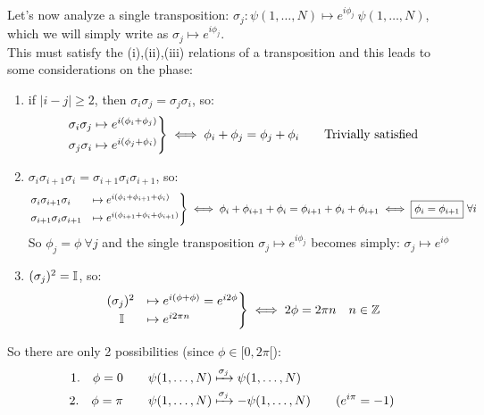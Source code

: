 Let's now analyze a single transposition: $\sigma_j : \psi(1,\dots, N) \mapsto e^{i\phi_j} \ \psi(1,\dots, N)$, which we will simply write as $\sigma_j \mapsto e^{i\phi_j}$.\\
This must satisfy the (i),(ii),(iii) relations of a transposition and this leads to some considerations on the phase:
\begin{enumerate}[label=\roman*]
    \item if $|i-j| \ge 2$, then $\sigma_i\sigma_j = \sigma_j\sigma_i$, so:
    \begin{align*}
    \begin{rcases}
        \sigma_i\sigma_j \mapsto e^{i(\phi_i + \phi_j)} \\
        \sigma_j\sigma_i \mapsto e^{i(\phi_j + \phi_i)}
    \end{rcases}
    \iff \phi_i + \phi_j = \phi_j + \phi_i \qquad \text{Trivially satisfied}
    \end{align*}
    
    \item $\sigma_i\sigma_{i+1} \sigma_i = \sigma_{i+1}\sigma_i\sigma_{i+1}$, so:
    \begin{equation*}
    \begin{rcases}    
        \sigma_i\sigma_{i+1}\sigma_i &\mapsto e^{i(\phi_i + \phi_{i+1} + \phi_i)} \\
        \sigma_{i+1}\sigma_i\sigma_{i+1} &\mapsto e^{i(\phi_{i+1} + \phi_i + \phi_{i+1})}
    \end{rcases}
    \iff \phi_i + \phi_{i+1} + \phi_i = \phi_{i+1} + \phi_i + \phi_{i+1}
    \iff \boxed{\phi_i = \phi_{i+1}} \ \forall i
    \end{equation*}
    So $\phi_j = \phi \ \forall j$ and the single transposition $\sigma_j \mapsto e^{i\phi_j}$ becomes simply: $\sigma_j \mapsto e^{i\phi}$

    \item $(\sigma_j)^2 = \mathbb{I}$, so:
    \begin{align*}
        \begin{rcases}
            (\sigma_j)^2 &\mapsto e^{i(\phi + \phi)} = e^{i2\phi} \\
            \quad \mathbb{I} &\mapsto e^{i2\pi n}
        \end{rcases}
        \iff 2\phi = 2\pi n \quad n\in \mathbb{Z}
    \end{align*}
\end{enumerate}

So there are only 2 possibilities (since $\phi \in [0,2\pi[$): 
\begin{equation*}
    \begin{aligned}
        1. \quad \phi = 0 \qquad &\psi(1,\dots,N) \xmapsto{\sigma_j} \psi(1,\dots,N) \\
        2. \quad \phi = \pi \qquad &\psi(1,\dots,N) \xmapsto{\sigma_j} -\psi(1,\dots,N) \qquad \small{(e^{i\pi} = -1)}
    \end{aligned}
\end{equation*}


